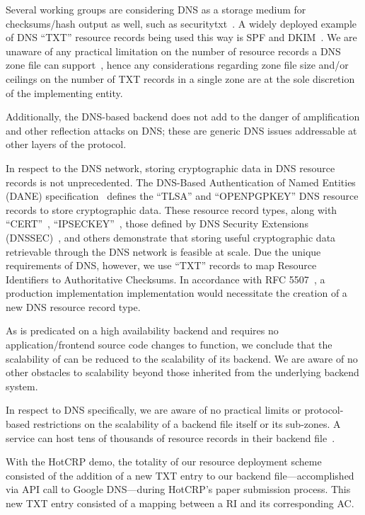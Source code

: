 Several working groups are considering DNS as a storage medium for
checksums/hash output as well, such as securitytxt~\cite{draft-sectxt}. A widely
deployed example of DNS ``TXT'' resource records being used this way is SPF and
DKIM~\cite{DKIM}. We are unaware of any practical limitation on the number of
resource records a DNS zone file can support~\cite{DNS1}, hence any
considerations regarding zone file size and/or ceilings on the number of TXT
records in a single zone are at the sole discretion of the implementing entity.

Additionally, the DNS-based backend does not add to the danger of amplification
and other reflection attacks on DNS; these are generic DNS issues addressable at
other layers of the protocol.

In respect to the DNS network, storing cryptographic data in DNS resource
records is not unprecedented. The DNS-Based Authentication of Named Entities
(DANE) specification~\cite{DANE1, DANE2, DANE3} defines the ``TLSA'' and
``OPENPGPKEY'' DNS resource records to store cryptographic data. These resource
record types, along with ``CERT''~\cite{CERT}, ``IPSECKEY''~\cite{IPSECKEY},
those defined by DNS Security Extensions (DNSSEC)~\cite{DNSSEC}, and others
demonstrate that storing useful cryptographic data retrievable through the DNS
network is feasible at scale. Due the unique requirements of DNS, however, we
use ``TXT'' records to map Resource Identifiers to Authoritative Checksums. In
accordance with RFC 5507~\cite{RFC5507}, a production implementation
implementation would necessitate the creation of a new DNS resource record type.

As \SYSTEM{} is predicated on a high availability backend and requires no
application/frontend source code changes to function, we conclude that the
scalability of \SYSTEM{} can be reduced to the scalability of its backend. We
are aware of no other obstacles to scalability beyond those inherited from the
underlying backend system.

In respect to DNS specifically, we are aware of no practical limits or
protocol-based restrictions on the scalability of a backend file itself or its
sub-zones. A service can host tens of thousands of resource records in their
backend file~\cite{DNS1, DNS2}.

With the HotCRP demo, the totality of our resource deployment scheme consisted
of the addition of a new TXT entry to our backend file---accomplished via API
call to Google DNS---during HotCRP's paper submission process. This new TXT
entry consisted of a mapping between a RI and its corresponding AC.

